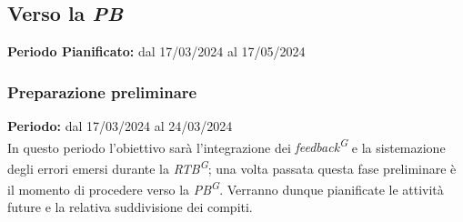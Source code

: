 \documentclass[5pt]{article}
\begin{document}
  
  \subsection{Verso la \textit{PB}}
    \textbf{Periodo Pianificato:} dal 17/03/2024 al 17/05/2024
    \subsubsection{Preparazione preliminare}
      \textbf{Periodo:} dal 17/03/2024 al 24/03/2024 
      \vspace{0.3cm} \\
      In questo periodo l'obiettivo sarà l'integrazione dei \textit{feedback\textsuperscript{G}} e la sistemazione degli errori emersi durante la \textit{RTB\textsuperscript{G}}; 
      una volta passata questa fase preliminare è il momento di procedere verso la \textit{PB\textsuperscript{G}}.
      Verranno dunque pianificate le attività future e la relativa suddivisione dei compiti.
    
\end{document}

